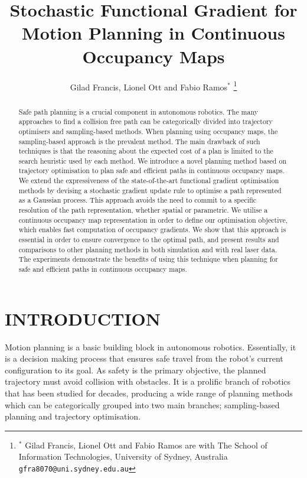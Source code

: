 \documentclass[letterpaper, 10 pt, conference]{ieeeconf}  %
\title{\LARGE \bf
Stochastic Functional Gradient for Motion Planning in Continuous Occupancy Maps
}
\author{Gilad Francis, Lionel Ott and Fabio Ramos{$^*$}%
\thanks{$^*$ Gilad Francis, Lionel Ott and Fabio Ramos are with The School of Information Technologies, University of Sydney, Australia
        {\tt\small gfra8070@uni.sydney.edu.au}}%
}
\begin{document}
\maketitle
\thispagestyle{empty}
\pagestyle{empty}


\begin{abstract}
Safe path planning is a crucial component in autonomous robotics. The many approaches to find a collision free path can be categorically divided into trajectory optimisers and sampling-based methods. When planning using occupancy maps, the sampling-based approach is the prevalent method. The main drawback of such techniques is that the reasoning about the expected cost of a plan is limited to the search heuristic used by each method. We introduce a novel planning method based on trajectory optimisation to plan safe and efficient paths in continuous occupancy maps. We extend the expressiveness of the state-of-the-art functional gradient optimisation methods by devising a stochastic gradient update rule to optimise a path represented as a Gaussian process. This approach avoids the need to commit to a specific resolution of the path representation, whether spatial or parametric. We utilise a continuous occupancy map representation in order to define our optimisation objective, which enables fast computation of occupancy gradients. We show that this approach is essential in order to ensure convergence to the optimal path, and present results and comparisons to other planning methods in both simulation and with real laser data. The experiments demonstrate the benefits of using this technique when planning for safe and efficient paths in continuous occupancy maps.   
\end{abstract}

  


\section{INTRODUCTION}

Motion planning is a basic building block in autonomous robotics. Essentially, it is a decision making process that ensures safe travel from the robot's current configuration to its goal. As safety is the primary objective, the planned trajectory must avoid collision with obstacles. It is a prolific branch of robotics that has been studied for decades, producing a wide range of planning methods which can be categorically grouped into two main branches; sampling-based planning and trajectory optimisation. 
  
\end{document}
